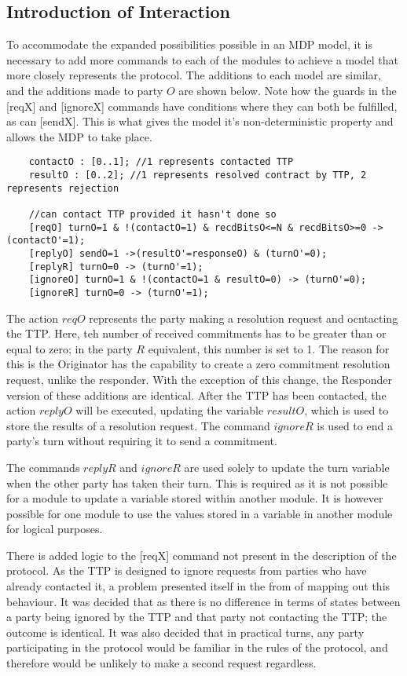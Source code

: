 \documentclass{l4proj}
\begin{document}
\subsection{Introduction of Interaction}

To accommodate the expanded possibilities possible in an MDP model, it is necessary to add more commands to each of the modules to achieve a model that more closely represents the protocol. The additions to each model are similar, and the additions made to party $O$ are shown below. Note how the guards in the [reqX] and [ignoreX] commands have conditions where they can both be fulfilled, as can [sendX]. This is what gives the model it's non-deterministic property and allows the MDP to take place.
\begin{lstlisting}
    contactO : [0..1]; //1 represents contacted TTP
    resultO : [0..2]; //1 represents resolved contract by TTP, 2 represents rejection
	
    //can contact TTP provided it hasn't done so
    [reqO] turnO=1 & !(contactO=1) & recdBitsO<=N & recdBitsO>=0 -> (contactO'=1);
    [replyO] sendO=1 ->(resultO'=responseO) & (turnO'=0);
    [replyR] turnO=0 -> (turnO'=1);
    [ignoreO] turnO=1 & !(contactO=1 & resultO=0) -> (turnO'=0);
	[ignoreR] turnO=0 -> (turnO'=1);
\end{lstlisting}

The action $reqO$ represents the party making a resolution request and ocntacting the TTP. Here, teh number of received commitments has to be greater than or equal to zero; in the party $R$ equivalent, this number is set to 1. The reason for this is the Originator has the capability to create a zero commitment resolution request, unlike the responder. With the exception of this change, the Responder version of these additions are identical. After the TTP has been contacted, the action $replyO$ will be executed, updating the variable $resultO$, which is used to store the results of a resolution request. The command $ignoreR$ is used to end a party's turn without requiring it to send a commitment.

The commands $replyR$ and $ignoreR$ are used solely to update the turn variable when the other party has taken their turn. This is required as it is not possible for a module to update a variable stored within another module. It is however possible for one module to use the values stored in a variable in another module for logical purposes.

There is added logic to the [reqX] command not present in the description of the protocol. As the TTP is designed to ignore requests from parties who have already contacted it, a problem presented itself in the from of mapping out this behaviour. It was decided that as there is no difference in terms of states between a party being ignored by the TTP and that party not contacting the TTP; the outcome is identical. It was also decided that in practical turns, any party participating in the protocol would be familiar in the rules of the protocol, and therefore would be unlikely to make a second request regardless.\\
\end{document}
